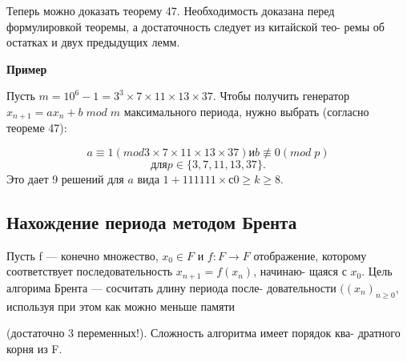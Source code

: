 {\begin{myproof}
\end{myproof}
Теперь можно доказать теорему 47. Необходимость доказана перед \linebreak формулировкой теоремы, а достаточность следует из китайской тео- \linebreak ремы об остатках и двух предыдущих лемм. \par 
\textbf{Пример} \par
Пусть $m = 10^{6} - 1 = 3^{3} \times 7 \times 11 \times 13 \times 37$. Чтобы получить генератор \linebreak $x_{n+1} = ax_{n} + b \; mod \; m$  максимального периода, нужно выбрать (согласно \linebreak теореме 47): \par 
$$a \equiv 1 (mod 3 \times 7 \times 11 \times 13 \times 37) и b \not\equiv 0 (mod \; p)$$
$$для p \in \{3, 7, 11, 13, 37\}.$$
\noindent Это дает 9 решений для $a$ вида $1 + 111111 \times с 0 \geqslant k \geqslant 8.$
\subsection{Нахождение периода методом Брента}
\noindent Пусть f --- конечно множество, $x_{0} \in F$ и $f: F \to F$ отображение, которому соответствует последовательность $x_{n+1} = f(x_{n})$, начинаю- \linebreak щаяся с $x_{0}$. Цель алгорима Брента --- сосчитать длину периода после- \linebreak довательности $((x_{n})_{n \geqslant 0}$, используя при этом как можно меньше памяти \linebreak


\noindent(достаточно 3 переменных!). Сложность алгоритма имеет порядок ква- \linebreak дратного корня из F.} \par 

